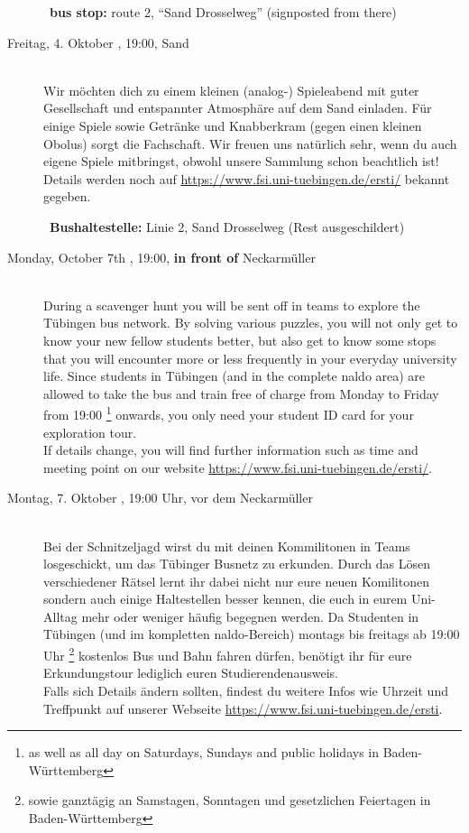 \begin{description}
	~\textbf{bus stop:} route 2, "`Sand Drosselweg"' (signposted from there)
\else
	\item[Freitag, 4. Oktober \YEAR, 19:00, Sand]\ \\
	Wir möchten dich zu einem kleinen (analog-) Spieleabend mit guter Gesellschaft und entspannter Atmosphäre auf dem Sand einladen. Für einige Spiele sowie Getränke und Knabberkram (gegen einen kleinen Obolus) sorgt die Fachschaft. Wir freuen uns natürlich sehr, wenn du auch eigene Spiele mitbringst, obwohl unsere Sammlung schon beachtlich ist! Details werden noch auf \url{https://www.fsi.uni-tuebingen.de/ersti/} bekannt gegeben.

	~\textbf{Bushaltestelle:} Linie 2, Sand Drosselweg (Rest ausgeschildert)
\fi

\ifml
	\item[Monday, October 7th \YEAR, 19:00, \textbf{in front of} Neckarmüller]\ \\
    During a scavenger hunt you will be sent off in teams to explore the Tübingen bus network. By solving various puzzles, you will not only get to know your new fellow students better, but also get to know some stops that you will encounter more or less frequently in your everyday university life. Since students in Tübingen (and in the complete naldo area) are allowed to take the bus and train free of charge from Monday to Friday from 19:00 \footnote{as well as all day on Saturdays, Sundays and public holidays in Baden-Württemberg} onwards, you only need your student ID card for your exploration tour.\\
If details change, you will find further information such as time and meeting point on our website \url{https://www.fsi.uni-tuebingen.de/ersti/}.\\

\else
	\item[Montag, 7. Oktober \YEAR, 19:00 Uhr, vor dem Neckarmüller]\ \\
    Bei der Schnitzeljagd wirst du mit deinen Kommilitonen in Teams losgeschickt, um das Tübinger Busnetz zu erkunden. Durch das Lösen verschiedener Rätsel lernt ihr dabei nicht nur eure neuen Komilitonen sondern auch einige Haltestellen besser kennen, die euch in eurem Uni-Alltag mehr oder weniger häufig begegnen werden. Da Studenten in Tübingen (und im kompletten naldo-Bereich) montags bis freitags ab 19:00 Uhr \footnote{sowie ganztägig an Samstagen, Sonntagen und gesetzlichen Feiertagen in Baden-Württemberg} kostenlos Bus und Bahn fahren dürfen, benötigt ihr für eure Erkundungstour lediglich euren Studierendenausweis.\\
    Falls sich Details ändern sollten, findest du weitere Infos wie Uhrzeit und Treffpunkt auf unserer Webseite \url{https://www.fsi.uni-tuebingen.de/ersti}.\\
\fi



\end{description}
